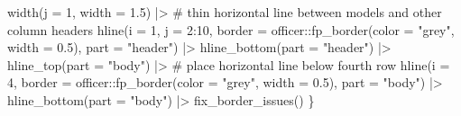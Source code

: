 \documentclass[
  letterpaper,
  DIV=11,
  numbers=noendperiod,
  oneside]{scrartcl}
\newenvironment{Shaded}{\begin{snugshade}}{\end{snugshade}}
\newcommand{\AttributeTok}[1]{\textcolor[rgb]{0.40,0.45,0.13}{#1}}
\newcommand{\CommentTok}[1]{\textcolor[rgb]{0.37,0.37,0.37}{#1}}
\newcommand{\DecValTok}[1]{\textcolor[rgb]{0.68,0.00,0.00}{#1}}
\newcommand{\FloatTok}[1]{\textcolor[rgb]{0.68,0.00,0.00}{#1}}
\newcommand{\FunctionTok}[1]{\textcolor[rgb]{0.28,0.35,0.67}{#1}}
\newcommand{\NormalTok}[1]{\textcolor[rgb]{0.00,0.23,0.31}{#1}}
\newcommand{\SpecialCharTok}[1]{\textcolor[rgb]{0.37,0.37,0.37}{#1}}
\newcommand{\StringTok}[1]{\textcolor[rgb]{0.13,0.47,0.30}{#1}}
\begin{document}
\begin{Shaded}
\begin{Highlighting}[]
      \FunctionTok{width}\NormalTok{(}\AttributeTok{j =} \DecValTok{1}\NormalTok{, }\AttributeTok{width =} \FloatTok{1.5}\NormalTok{) }\SpecialCharTok{|\textgreater{}}
      \CommentTok{\# thin horizontal line between models and other column headers}
      \FunctionTok{hline}\NormalTok{(}\AttributeTok{i =} \DecValTok{1}\NormalTok{, }\AttributeTok{j =} \DecValTok{2}\SpecialCharTok{:}\DecValTok{10}\NormalTok{, }\AttributeTok{border =}\NormalTok{ officer}\SpecialCharTok{::}\FunctionTok{fp\_border}\NormalTok{(}\AttributeTok{color =} \StringTok{"grey"}\NormalTok{, }\AttributeTok{width =} \FloatTok{0.5}\NormalTok{), }\AttributeTok{part =} \StringTok{"header"}\NormalTok{) }\SpecialCharTok{|\textgreater{}}
      \FunctionTok{hline\_bottom}\NormalTok{(}\AttributeTok{part =} \StringTok{"header"}\NormalTok{) }\SpecialCharTok{|\textgreater{}}
      \FunctionTok{hline\_top}\NormalTok{(}\AttributeTok{part =} \StringTok{"body"}\NormalTok{) }\SpecialCharTok{|\textgreater{}}
      \CommentTok{\# place horizontal line below fourth row}
      \FunctionTok{hline}\NormalTok{(}\AttributeTok{i =} \DecValTok{4}\NormalTok{, }\AttributeTok{border =}\NormalTok{ officer}\SpecialCharTok{::}\FunctionTok{fp\_border}\NormalTok{(}\AttributeTok{color =} \StringTok{"grey"}\NormalTok{, }\AttributeTok{width =} \FloatTok{0.5}\NormalTok{), }\AttributeTok{part =} \StringTok{"body"}\NormalTok{) }\SpecialCharTok{|\textgreater{}}
      \FunctionTok{hline\_bottom}\NormalTok{(}\AttributeTok{part =} \StringTok{"body"}\NormalTok{) }\SpecialCharTok{|\textgreater{}}
      \FunctionTok{fix\_border\_issues}\NormalTok{()}
\NormalTok{\}}
\end{Highlighting}
\end{Shaded}
\end{document}
